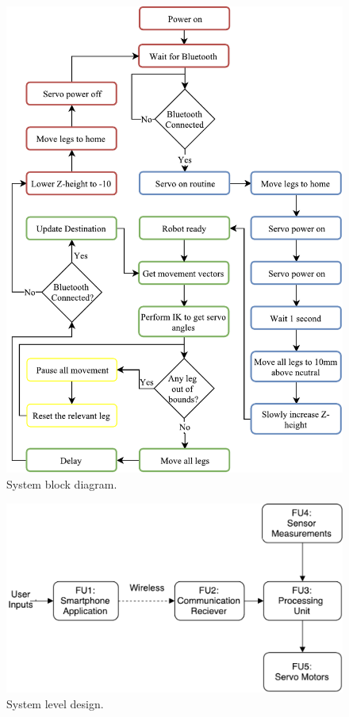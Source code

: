 \begin{figure}[H]
\centering
\includegraphics[scale = 0.8]{pics/Soft2.pdf}
\caption{System block diagram.}
\end{figure}


\begin{figure}[H]
\centering
\includegraphics[scale = 0.5]{Proposal/FunctionalDiagram.pdf}
\caption{System level design.}
\end{figure}

